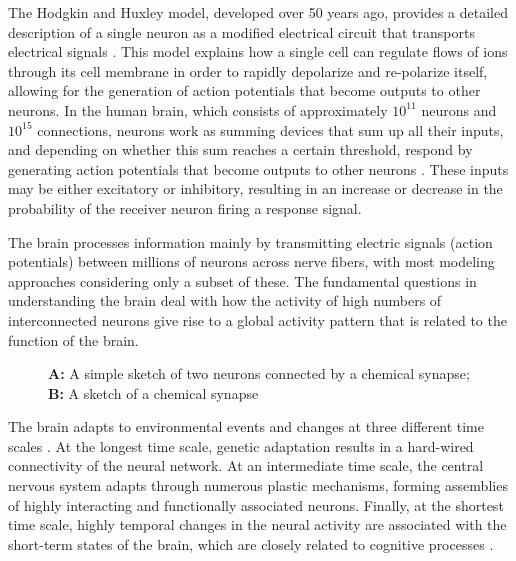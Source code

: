 \documentclass[12pt,a4paper]{report}
\begin{document}
The Hodgkin and Huxley model, developed over 50 years ago, provides a detailed description of a single neuron as a modified electrical circuit that transports electrical signals \cite{ref4}. This model explains how a single cell can regulate flows of ions through its cell membrane in order to rapidly depolarize and re-polarize itself, allowing for the generation of action potentials that become outputs to other neurons. In the human brain, which consists of approximately \(10^{11}\)
neurons and \(10^{15}\) connections, neurons work as summing devices that sum up all their inputs, and depending on whether this sum reaches a certain threshold, respond by generating action potentials that become outputs to other neurons \cite{ref5}. These inputs may be either excitatory or inhibitory, resulting in an increase or decrease in the probability of the receiver neuron firing a response signal.

The brain processes information mainly by transmitting electric signals (action potentials) between millions of neurons across nerve fibers, with most modeling approaches considering only a subset of these. The fundamental questions in understanding the brain deal with how the activity of high numbers of interconnected neurons give rise to a global activity pattern that is related to the function of the brain.



\begin{figure}[H]
    \centering %
\caption[A: A simple sketch of two neurons connected by a chemical synapse; B: A sketch of a chemical synapse]{\textbf{A:} A simple sketch of two neurons connected by a chemical synapse; \\ \textbf{B:} A sketch of a chemical synapse} 
\end{figure}
    
The brain adapts to environmental events and changes at three different time scales  \cite{ref6}. At the longest time scale, genetic adaptation results in a hard-wired connectivity of the neural network. At an intermediate time scale, the central nervous system adapts through numerous plastic mechanisms, forming assemblies of highly interacting and functionally associated neurons. Finally, at the shortest time scale, highly temporal changes in the neural activity are associated with the short-term states of the brain, which are closely related to cognitive processes \cite{ref7}.
    
\end{document}
